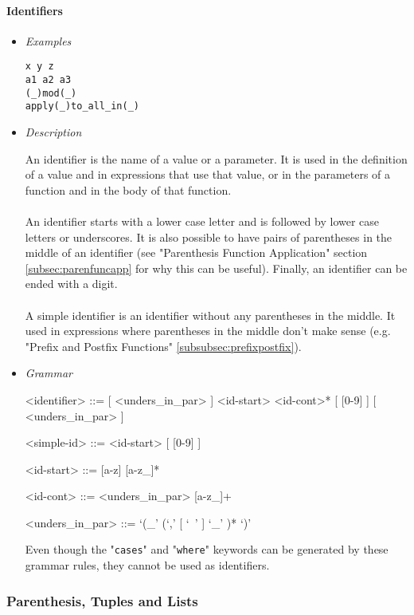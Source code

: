 \documentclass{article}
\begin{document}
\paragraph{Identifiers}
\begin{itemize}

\item \textit{Examples}
\begin{verbatim}
x y z
a1 a2 a3
(_)mod(_)
apply(_)to_all_in(_)
\end{verbatim}

\item \textit{Description}

An identifier is the name of a value or a parameter. It is used in the
definition of a value and in expressions that use that value, or in the
parameters of a function and in the body of that function.
\\\\
An identifier starts with a lower case letter and is followed by lower case
letters or underscores. It is also possible to have pairs of parentheses in the
middle of an identifier (see "Parenthesis Function Application" section
\ref{subsec:parenfuncapp} for why this can be useful).  Finally, an identifier
can be ended with a digit.
\\\\
A simple identifier is an identifier without any parentheses in the middle.
It used in expressions where parentheses in the middle don't make sense
(e.g. "Prefix and Postfix Functions" \ref{subsubsec:prefixpostfix}).

\item \textit{Grammar}
\begin{grammar}
<identifier> ::=
[ <unders_in_par> ] <id-start> <id-cont>* [ [0-9] ] [ <unders_in_par> ]

<simple-id> ::= <id-start> [ [0-9] ]

<id-start> ::= [a-z] [a-z_]*

<id-cont> ::= <unders_in_par> [a-z_]+

<unders_in_par> ::= `(_' (`,' [ `\ ' ] `_' )* `)'
\end{grammar}
Even though the "\verb|cases|" and "\verb|where|" keywords can be generated
by these grammar rules, they cannot be used as identifiers.

\end{itemize}

\newpage
\subsubsection{Parenthesis, Tuples and Lists}
\end{document}
